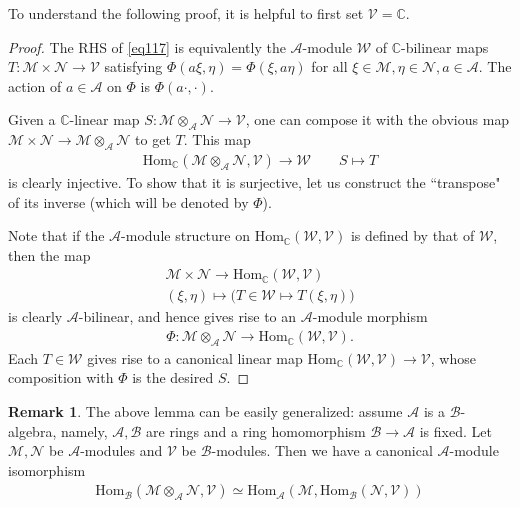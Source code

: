 \documentclass[12pt,b5paper,notitlepage]{report}
\theoremstyle{definition}
\newtheorem{rem}[df]{Remark}
\theoremstyle{plain}
\newcommand{\mc}{\mathcal}
\newcommand{\Hom}{\mathrm{Hom}}
\newcommand{\Cbb}{\mathbb C}
\numberwithin{equation}{section}
\begin{document}
To understand the following proof, it is helpful to first set $\mc V=\Cbb$.

\begin{proof}
The RHS of \eqref{eq117} is equivalently the $\mc A$-module $\mc W$ of $\Cbb$-bilinear maps $T:\mc M\times\mc N\rightarrow \mc V$ satisfying $\Phi(a\xi,\eta)=\Phi(\xi, a\eta)$ for all $\xi\in\mc M,\eta\in\mc N,a\in\mc A$. The action of $a\in\mc A$ on $\Phi$ is $\Phi(a\cdot,\cdot)$.


Given a $\Cbb$-linear map $S:\mc M\otimes_{\mc A}\mc N\rightarrow\mc V$, one can compose it with the obvious map $\mc M\times\mc N\rightarrow\mc M\otimes_{\mc A}\mc N$ to get $T$. This map
\begin{gather*}
\Hom_\Cbb(\mc M\otimes_{\mc A}\mc N,\mc V)\rightarrow \mc W\qquad S\mapsto T
\end{gather*}
is clearly injective. To show that it is surjective, let us construct the ``transpose" of its inverse (which will be denoted by $\Phi$). 

Note that if the $\mc A$-module structure on $\Hom_\Cbb(\mc W,\mc V)$ is defined by that of $\mc W$, then the map
\begin{gather*}
\mc M\times\mc N\rightarrow\Hom_\Cbb(\mc W,\mc V)\\
(\xi,\eta)\mapsto  \big(T\in\mc W\mapsto T(\xi,\eta) \big)
\end{gather*}
is clearly $\mc A$-bilinear, and hence gives rise to an $\mc A$-module morphism
\begin{align*}
\Phi:\mc M\otimes_{\mc A}\mc N\rightarrow \Hom_\Cbb(\mc W,\mc V).
\end{align*}
Each $T\in\mc W$ gives rise to a canonical linear map $\Hom_\Cbb(\mc W,\mc V)\rightarrow \mc V$, whose composition with $\Phi$ is the desired $S$.
\end{proof}


\begin{rem}
The above lemma can be easily generalized: assume $\mc A$ is a $\mc B$-algebra, namely, $\mc A,\mc B$ are rings and a ring homomorphism $\mc B\rightarrow\mc A$ is fixed. Let $\mc M,\mc N$ be $\mc A$-modules and $\mc V$ be $\mc B$-modules. Then we have a canonical $\mc A$-module isomorphism
\begin{align*}
\Hom_{\mc B}(\mc M\otimes_{\mc A}\mc N,\mc V)\simeq \Hom_{\mc A}(\mc M,\Hom_{\mc B}(\mc N,\mc V))
\end{align*}
\end{rem}
\end{document}

